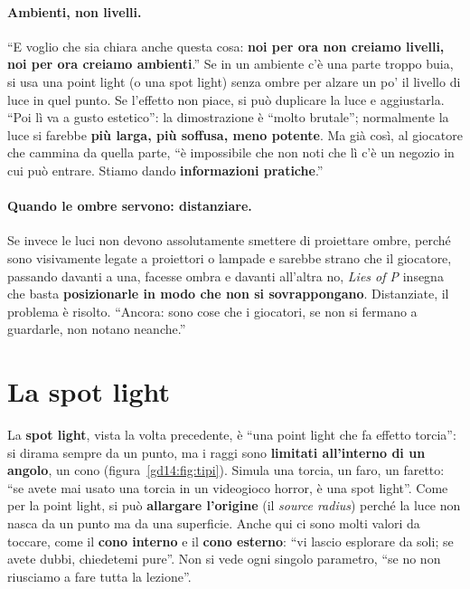 \paragraph{Ambienti, non livelli.} ``E voglio che sia chiara anche questa cosa:
\textbf{noi per ora non creiamo livelli, noi per ora creiamo ambienti}.'' Se in un
ambiente c'è una parte troppo buia, si usa una point light (o una spot light) senza
ombre per alzare un po' il livello di luce in quel punto. Se l'effetto non piace, si
può duplicare la luce e aggiustarla. ``Poi lì va a gusto estetico'': la
dimostrazione è ``molto brutale''; normalmente la luce si farebbe \textbf{più larga,
più soffusa, meno potente}. Ma già così, al giocatore che cammina da quella parte,
``è impossibile che non noti che lì c'è un negozio in cui può entrare. Stiamo dando
\textbf{informazioni pratiche}.''

\paragraph{Quando le ombre servono: distanziare.} Se invece le luci non devono
assolutamente smettere di proiettare ombre, perché sono visivamente legate a
proiettori o lampade e sarebbe strano che il giocatore, passando davanti a una,
facesse ombra e davanti all'altra no, \emph{Lies of P} insegna che basta
\textbf{posizionarle in modo che non si sovrappongano}. Distanziate, il problema è
risolto. ``Ancora: sono cose che i giocatori, se non si fermano a guardarle, non
notano neanche.''

\section{La spot light}
\label{gd14:sec:spot}



La \textbf{spot light}, vista la volta precedente, è ``una point light che fa effetto
torcia'': si dirama sempre da un punto, ma i raggi sono \textbf{limitati all'interno
di un angolo}, un cono (figura~\ref{gd14:fig:tipi}). Simula una torcia, un faro, un
faretto: ``se avete mai usato una torcia in un videogioco horror, è una spot
light''. Come per la point light, si può \textbf{allargare l'origine} (il
\emph{source radius}) perché la luce non nasca da un punto ma da una superficie.
Anche qui ci sono molti valori da toccare, come il \textbf{cono interno} e il
\textbf{cono esterno}: ``vi lascio esplorare da soli; se avete dubbi, chiedetemi
pure''. Non si vede ogni singolo parametro, ``se no non riusciamo a fare tutta la
lezione''.

